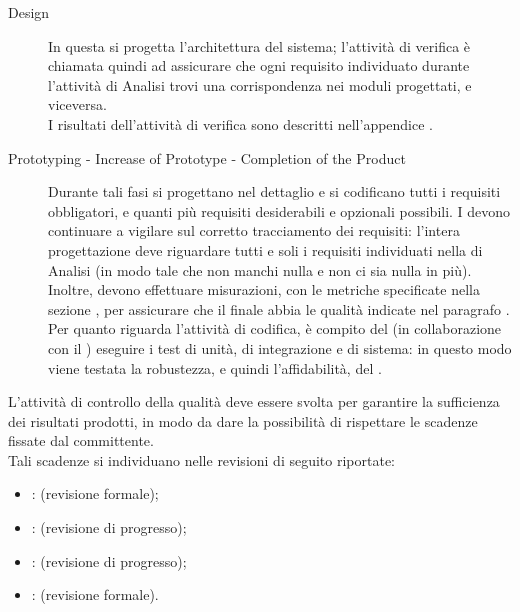 \begin{description}
		\item[  Design] In questa  si progetta l'architettura del sistema; l'attività di verifica è chiamata quindi ad assicurare che ogni requisito individuato durante l'attività di Analisi trovi una corrispondenza nei moduli progettati, e viceversa. \\
		I risultati dell'attività di verifica sono descritti nell'appendice .\\
		\item[ Prototyping - Increase of Prototype - Completion of the Product] Durante tali fasi si progettano nel dettaglio e si codificano tutti i requisiti obbligatori, e quanti più requisiti desiderabili e opzionali possibili.
		I  devono continuare a vigilare sul corretto tracciamento dei requisiti: l'intera progettazione deve riguardare tutti e soli i requisiti individuati nella  di Analisi (in modo tale che non manchi nulla e non ci sia nulla in più). Inoltre, devono effettuare misurazioni, con le metriche specificate nella sezione , per assicurare che il  finale abbia le qualità indicate nel paragrafo .
		Per quanto riguarda l'attività di codifica, è compito del  (in collaborazione con il ) eseguire i test di unità, di 
		integrazione e di sistema: in questo modo viene testata la robustezza, e quindi l'affidabilità, del .\\
		\end{description}
			L'attività di controllo della qualità deve essere svolta per garantire la sufficienza dei risultati prodotti, in modo da dare la possibilità di rispettare le scadenze fissate dal committente.\\
			Tali scadenze si individuano nelle revisioni di seguito riportate:
			\begin{itemize}
				\item {}:  (revisione formale);
				\item {}:  (revisione di progresso);
				\item {}:  (revisione di progresso);
				\item {}:  (revisione formale).
			\end{itemize}
